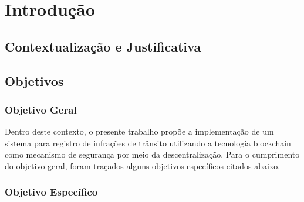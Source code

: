 \chapter[Introdução]{Introdução}


\section{Contextualização e Justificativa}

\section{Objetivos}

    \subsection{Objetivo Geral}
    
    Dentro deste contexto, o presente trabalho propõe a implementação de um sistema para registro de infrações de trânsito utilizando a tecnologia blockchain como mecanismo de segurança por meio da descentralização. Para o cumprimento do objetivo geral, foram traçados alguns objetivos específicos citados abaixo.

    \subsection{Objetivo Específico}


